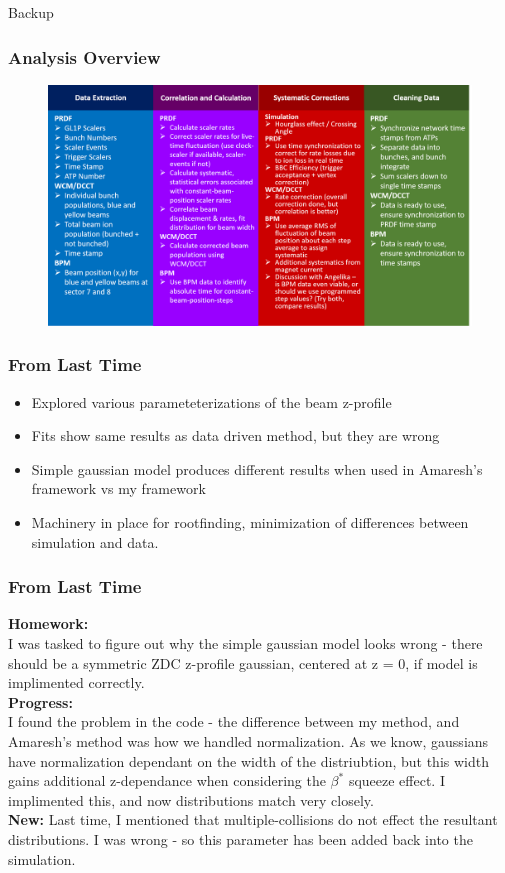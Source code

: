 \begin{frame}
  \begin{center}
    \Huge Backup
  \end{center}
\end{frame}

\begin{frame}
  \frametitle{Analysis Overview}
  \begin{figure}
    \includegraphics[width=\linewidth]{"./figures/analysis_map_wide"}
  \end{figure}
\end{frame}

\begin{frame}
\frametitle{From Last Time}
\begin{itemize}
	\item Explored various parameteterizations of the beam z-profile
	\item Fits show same results as data driven method, but they are wrong
	\item Simple gaussian model produces different results when used in Amaresh's
		framework vs my framework
	\item Machinery in place for rootfinding, minimization of differences between
		simulation and data.
\end{itemize}
\end{frame}
\begin{frame}
\frametitle{From Last Time}

\textbf{Homework:} \\
I was tasked to figure out why the simple gaussian model looks wrong - there
should be a symmetric ZDC z-profile gaussian, centered at z = 0, if model is
implimented correctly.\\
\textbf{Progress:} \\
I found the problem in the code - the difference between my method, and
Amaresh's method was how we handled normalization. As we know, gaussians have
normalization dependant on the width of the distriubtion, but this width gains
additional z-dependance when considering the $\beta^*$ squeeze effect. I
implimented this, and now distributions match very closely.\\
\textbf{New:}
Last time, I mentioned that multiple-collisions do not effect the resultant
distributions. I was wrong - so this parameter has been added back into the
simulation.
\end{frame}

